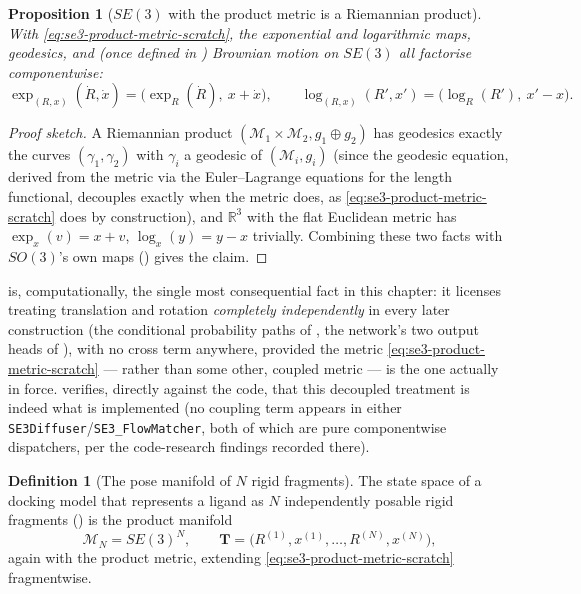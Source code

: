 \documentclass[11pt,a4paper]{report}
\newtheorem{proposition}[proposition]{Proposition}
\theoremstyle{definition}
\newtheorem{definition}[definition]{Definition}
\theoremstyle{remark}
\newcommand{\RR}{\mathbb R}
\newcommand{\pyfunc}[1]{\texttt{#1}}
\begin{document}
\begin{proposition}[$SE(3)$ with the product metric is a Riemannian product]
\label{prop:se3-product}
With \eqref{eq:se3-product-metric-scratch}, the exponential and logarithmic
maps, geodesics, and (once defined in ) Brownian
motion on $SE(3)$ all factorise componentwise:
\[
\exp_{(R,x)}(\dot R,\dot x) = \bigl(\exp_R(\dot R),\ x+\dot x\bigr),
\qquad
\log_{(R,x)}(R',x') = \bigl(\log_R(R'),\ x'-x\bigr) .
\]
\end{proposition}

\begin{proof}[Proof sketch]
A Riemannian product $(\mathcal M_1\times\mathcal M_2, g_1\oplus g_2)$ has
geodesics exactly the curves $(\gamma_1,\gamma_2)$ with $\gamma_i$ a
geodesic of $(\mathcal M_i,g_i)$ (since the geodesic equation, derived from
the metric via the Euler--Lagrange equations for the length functional,
decouples exactly when the metric does, as \eqref{eq:se3-product-metric-scratch}
does by construction), and $\RR^3$ with the flat Euclidean metric has
$\exp_x(v)=x+v$, $\log_x(y)=y-x$ trivially. Combining these two facts with
$SO(3)$'s own maps () gives
the claim.
\end{proof}

 is, computationally, the single most consequential
fact in this chapter: it licenses treating translation and rotation
\emph{completely independently} in every later construction (the
conditional probability paths of ,
the network's two output heads of ),
with no cross term anywhere, provided the metric
\eqref{eq:se3-product-metric-scratch} --- rather than some other, coupled
metric --- is the one actually in force.  verifies,
directly against the code, that this decoupled treatment is indeed what is
implemented (no coupling term appears in either
\pyfunc{SE3Diffuser}/\pyfunc{SE3\_FlowMatcher}, both of which are pure
componentwise dispatchers, per the code-research findings recorded there).

\begin{definition}[The pose manifold of $N$ rigid fragments]
\label{def:pose-manifold-scratch}
The state space of a docking model that represents a ligand as $N$
independently posable rigid fragments ()
is the product manifold
\[
\mathcal M_N = SE(3)^N,
\qquad
\mathbf T = \bigl(R^{(1)},x^{(1)},\dots,R^{(N)},x^{(N)}\bigr),
\]
again with the product metric, extending \eqref{eq:se3-product-metric-scratch}
fragmentwise.
\end{definition}
\end{document}
